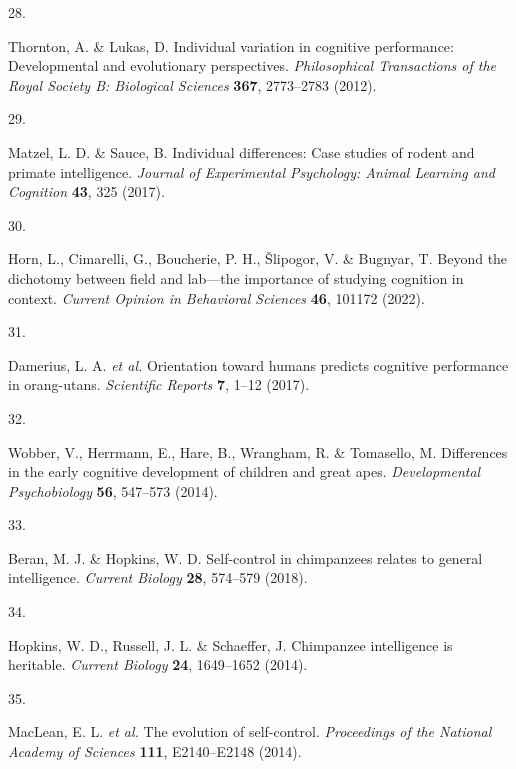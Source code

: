 \documentclass[
  man,floatsintext]{apa6}
\newlength{\cslhangindent}
\newlength{\csllabelwidth}
\newlength{\cslentryspacingunit} %
\newenvironment{CSLReferences}[2] %
 {%
  \setlength{\parindent}{0pt}
  \ifodd #1
  \let\oldpar\par
  \def\par{\hangindent=\cslhangindent\oldpar}
  \fi
  \setlength{\parskip}{#2\cslentryspacingunit}
 }%
 {}
\newcommand{\CSLLeftMargin}[1]{\parbox[t]{\csllabelwidth}{#1}}
\newcommand{\CSLRightInline}[1]{\parbox[t]{\linewidth - \csllabelwidth}{#1}\break}
\begin{document}
\begin{CSLReferences}{0}{0}
\leavevmode{}%
\CSLLeftMargin{28. }%
\CSLRightInline{Thornton, A. \& Lukas, D. Individual variation in cognitive performance: Developmental and evolutionary perspectives. \emph{Philosophical Transactions of the Royal Society B: Biological Sciences} \textbf{367}, 2773--2783 (2012).}

\leavevmode{}%
\CSLLeftMargin{29. }%
\CSLRightInline{Matzel, L. D. \& Sauce, B. Individual differences: Case studies of rodent and primate intelligence. \emph{Journal of Experimental Psychology: Animal Learning and Cognition} \textbf{43}, 325 (2017).}

\leavevmode{}%
\CSLLeftMargin{30. }%
\CSLRightInline{Horn, L., Cimarelli, G., Boucherie, P. H., Šlipogor, V. \& Bugnyar, T. Beyond the dichotomy between field and lab---the importance of studying cognition in context. \emph{Current Opinion in Behavioral Sciences} \textbf{46}, 101172 (2022).}

\leavevmode{}%
\CSLLeftMargin{31. }%
\CSLRightInline{Damerius, L. A. \emph{et al.} Orientation toward humans predicts cognitive performance in orang-utans. \emph{Scientific Reports} \textbf{7}, 1--12 (2017).}

\leavevmode{}%
\CSLLeftMargin{32. }%
\CSLRightInline{Wobber, V., Herrmann, E., Hare, B., Wrangham, R. \& Tomasello, M. Differences in the early cognitive development of children and great apes. \emph{Developmental Psychobiology} \textbf{56}, 547--573 (2014).}

\leavevmode{}%
\CSLLeftMargin{33. }%
\CSLRightInline{Beran, M. J. \& Hopkins, W. D. Self-control in chimpanzees relates to general intelligence. \emph{Current Biology} \textbf{28}, 574--579 (2018).}

\leavevmode{}%
\CSLLeftMargin{34. }%
\CSLRightInline{Hopkins, W. D., Russell, J. L. \& Schaeffer, J. Chimpanzee intelligence is heritable. \emph{Current Biology} \textbf{24}, 1649--1652 (2014).}

\leavevmode{}%
\CSLLeftMargin{35. }%
\CSLRightInline{MacLean, E. L. \emph{et al.} The evolution of self-control. \emph{Proceedings of the National Academy of Sciences} \textbf{111}, E2140--E2148 (2014).}


\end{CSLReferences}
\end{document}
